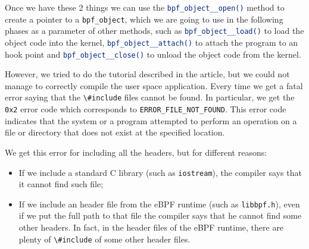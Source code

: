 Once we have these 2 things we can use the \colorbox{backcolour}{\lstinline[style=commandline, language=bash, breaklines=true]|bpf_object__open()|} method to create a pointer to a \colorbox{backcolour}{\lstinline[style=commandline, language=bash, breaklines=true]|bpf_object|}, which we are going to use in the following phases as a parameter of other methods, such as \colorbox{backcolour}{\lstinline[style=commandline, language=bash, breaklines=true]|bpf_object__load()|} to load the object code into the kernel, \colorbox{backcolour}{\lstinline[style=commandline, language=bash, breaklines=true]|bpf_object__attach()|} to attach the program to an hook point and \colorbox{backcolour}{\lstinline[style=commandline, language=bash, breaklines=true]|bpf_object__close()|} to unload the object code from the kernel.

However, we tried to do the tutorial described in the article, but we could not manage to correctly compile the user space application.
Every time we get a fatal error saying that the  \colorbox{backcolour}{\lstinline[style=commandline, language=bash, breaklines=true]|\#include|} files cannot be found.
In particular, we get the \colorbox{backcolour}{\lstinline[style=commandline, language=bash, breaklines=true]|0x2|} error code which corresponds to \colorbox{backcolour}{\lstinline[style=commandline, language=bash, breaklines=true]|ERROR_FILE_NOT_FOUND|}. 
This error code indicates that the system or a program attempted to perform an operation on a file or directory that does not exist at the specified location.

We get this error for including all the headers, but for different reasons:

\begin{itemize}
	\item 
		If we include a standard C library (such as \colorbox{backcolour}{\lstinline[style=commandline, language=bash, breaklines=true]|iostream|}), the compiler says that it cannot find such file;
	\item 
		If we include an header file from the eBPF runtime (such as \colorbox{backcolour}{\lstinline[style=commandline, language=bash, breaklines=true]|libbpf.h|}), even if we put the full path to that file the compiler says that he cannot find some other headers.
		In fact, in the header files of the eBPF runtime, there are plenty of \colorbox{backcolour}{\lstinline[style=commandline, language=bash, breaklines=true]|\#include|} of some other header files.
\end{itemize}

